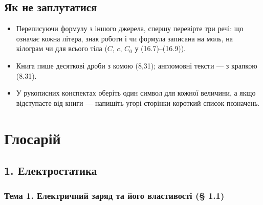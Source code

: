 \documentclass[11pt,a4paper,oneside]{book}
\begin{document}
\section*{Як не заплутатися}
\begin{itemize}
\item Переписуючи формулу з іншого джерела, спершу перевірте три речі: що означає кожна літера, знак роботи і чи формула записана на моль, на кілограм чи для всього тіла ($C$, $c$, $C_0$ у (16.7)–(16.9)).
\item Книга пише десяткові дроби з комою (8,31); англомовні тексти — з крапкою (8.31).
\item У рукописних конспектах оберіть один символ для кожної величини, а якщо відступаєте від книги — напишіть угорі сторінки короткий список позначень.
\end{itemize}

\chapter*{Глосарій}
\section*{1. Електростатика}

\subsection*{Тема 1. Електричний заряд та його властивості (§ 1.1)}
\end{document}
